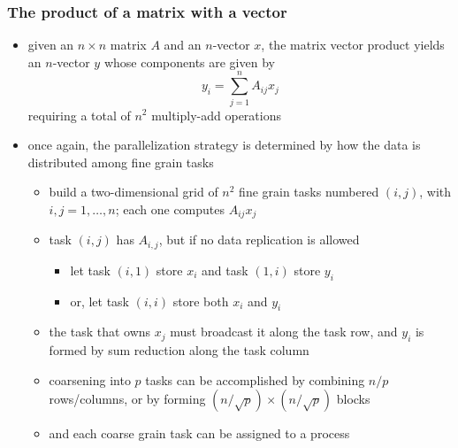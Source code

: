 \begin{frame}[fragile]
%
  \frametitle{The product of a matrix with a vector}
%
  \begin{itemize}
%
  \item given an $n \times n$ matrix $A$ and an $n$-vector $x$, the matrix vector product
    yields an $n$-vector $y$ whose components are given by
    \begin{equation}
      y_{i} = \sum_{j=1}^{n} A_{ij} x_{j}
    \end{equation}
    requiring a total of $n^{2}$ multiply-add operations
%
  \item once again, the parallelization strategy is determined by how the data is distributed
    among fine grain tasks
    \begin{itemize}
    \item build a two-dimensional grid of $n^{2}$ fine grain tasks numbered $(i,j)$, with $i,j
      = 1, \ldots, n$; each one computes $A_{ij}x_{j}$
    \item task $(i,j)$ has $A_{i,j}$, but if no data replication is allowed
      \begin{itemize}
      \item let task $(i,1)$ store $x_{i}$ and task $(1,i)$ store $y_{i}$
      \item or, let task $(i,i)$ store both $x_{i}$ and $y_{i}$
      \end{itemize}
    \item the task that owns $x_{j}$ must broadcast it along the  task row, and $y_{i}$
      is formed by sum reduction along the  task column
    \item coarsening into $p$ tasks can be accomplished by combining $n/p$ rows/columns, or by
      forming $(n/\sqrt{p}) \times (n/\sqrt{p})$ blocks
    \item and each coarse grain task can be assigned to a process
    \end{itemize}
%
  \end{itemize}
%
\end{frame}

